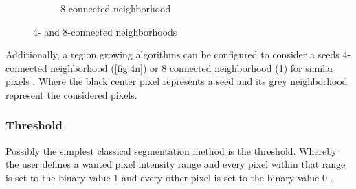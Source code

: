 \begin{figure}[h!]
\begin{subfigure}{0.49\textwidth}
{}
		\caption{8-connected neighborhood}\label{fig:8n}
	\end{subfigure}
	\caption{4- and 8-connected neighborhoods}\label{fig:neighborhoods}
\end{figure}

\noindent
Additionally, a region growing algorithms can be configured to consider a seeds 4-connected neighborhood
(\cref{fig:4n}) or 8 connected neighborhood (\cref{fig:8n}) for similar pixels \cite{jourlinVariousContrastConcepts2016,palReviewImageSegmentation1993}.
Where the black center pixel represents a seed and its grey neighborhood represent the considered pixels.
\pagebreak

\subsubsection{Threshold}
Possibly the simplest classical segmentation method is the threshold.
Whereby the user defines a wanted pixel intensity range and every pixel within that range is set to the binary value $1$
and every other pixel is set to the binary value $0$ \cite{sankurSurveyImageThresholding2004}.

